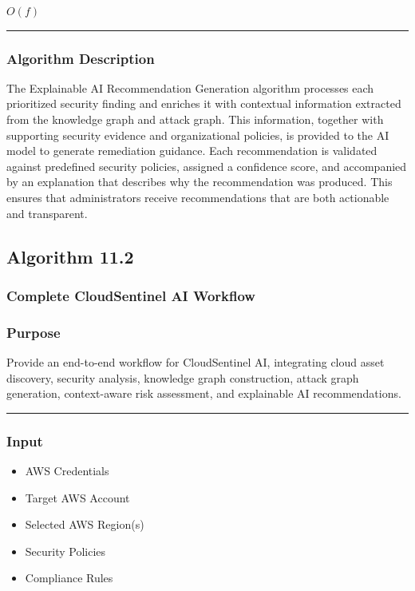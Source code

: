 $O(f)$

\begin{center}\rule{0.5\linewidth}{0.5pt}\end{center}

\subsubsection{Algorithm Description}

The Explainable AI Recommendation Generation algorithm processes each prioritized security finding and enriches it with contextual information extracted from the knowledge graph and attack graph. This information, together with supporting security evidence and organizational policies, is provided to the AI model to generate remediation guidance. Each recommendation is validated against predefined security policies, assigned a confidence score, and accompanied by an explanation that describes why the recommendation was produced. This ensures that administrators receive recommendations that are both actionable and transparent.

\subsection{Algorithm 11.2}

\subsubsection{Complete CloudSentinel AI Workflow}

\subsubsection{\texorpdfstring{\textbf{Purpose}}{Purpose}}

Provide an end-to-end workflow for CloudSentinel AI, integrating cloud asset discovery, security analysis, knowledge graph construction, attack graph generation, context-aware risk assessment, and explainable AI recommendations.

\begin{center}\rule{0.5\linewidth}{0.5pt}\end{center}

\subsubsection{\texorpdfstring{\textbf{Input}}{Input}}

\begin{itemize}
\tightlist
\item
  AWS Credentials\\
\item
  Target AWS Account\\
\item
  Selected AWS Region(s)\\
\item
  Security Policies\\
\item
  Compliance Rules
\end{itemize}

